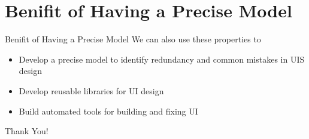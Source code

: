 \documentclass{beamer}
\begin{document}
	\section{Benifit of Having a Precise Model}
	\begin{frame}{Benifit of Having a Precise Model}
		We can also use these properties to
	    \begin{itemize}
	    	\item Develop a precise model to identify redundancy and common mistakes in UIS design\pause
	    	\item Develop reusable libraries for UI design\pause
	    	\item Build automated tools for building and fixing UI
	    \end{itemize}
	\end{frame}
	
	\begin{frame}
		\begin{center}
			\Huge Thank You!
		\end{center}
	\end{frame}
\end{document}
